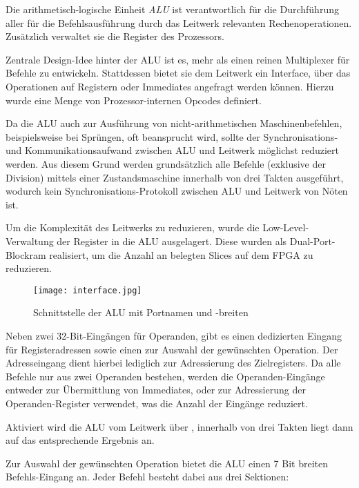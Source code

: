 \label{ch:alu}

Die arithmetisch-logische Einheit \textit{ALU} ist verantwortlich f\"ur die Durchf\"uhrung aller f\"ur die Befehlsausf\"uhrung durch das Leitwerk relevanten Rechenoperationen. Zus\"atzlich verwaltet sie die Register des Prozessors.


Zentrale Design-Idee hinter der ALU ist es, mehr als einen reinen Multiplexer f\"ur Befehle zu entwickeln. Stattdessen bietet sie dem Leitwerk ein Interface,
\"uber das Operationen auf Registern oder Immediates angefragt werden k\"onnen. Hierzu wurde eine Menge von Prozessor-internen Opcodes definiert.

Da die ALU auch zur Ausf\"uhrung von nicht-arithmetischen Maschinenbefehlen, beispielsweise bei Spr\"ungen, oft beansprucht wird, sollte der Synchronisations- und Kommunikationsaufwand zwischen ALU und Leitwerk m\"oglichst reduziert werden.
Aus diesem Grund werden grunds\"atzlich alle Befehle (exklusive der Division) mittels einer Zustandsmaschine innerhalb von drei Takten ausgef\"uhrt, wodurch kein Synchronisations-Protokoll zwischen ALU und Leitwerk von N\"oten ist.

Um die Komplexit\"at des Leitwerks zu reduzieren, wurde die Low-Level-Verwaltung der Register in die ALU ausgelagert. Diese wurden als Dual-Port-Blockram realisiert, um die Anzahl an belegten Slices auf dem FPGA zu reduzieren.

\begin{figure}[H]
	\centering
	\label{fig:aluinterface}
		\texttt{[image: interface.jpg]}
	\caption[Schnittstelle der ALU-Einheit]{Schnittstelle der ALU mit Portnamen und -breiten}
\end{figure}

Neben zwei 32-Bit-Eing\"angen f\"ur Operanden, gibt es einen dedizierten Eingang f\"ur Registeradressen sowie einen zur Auswahl der gew\"unschten Operation. 
Der Adresseingang dient hierbei lediglich zur Adressierung des Zielregisters. Da alle Befehle nur aus zwei Operanden bestehen, werden die Operanden-Eing\"ange entweder zur \"Ubermittlung von Immediates, oder zur Adressierung der Operanden-Register verwendet, was die Anzahl der Eing\"ange reduziert.

Aktiviert wird die ALU vom Leitwerk \"uber , innerhalb von drei Takten liegt dann auf  das entsprechende Ergebnis an.

Zur Auswahl der gew\"unschten Operation bietet die ALU einen 7 Bit breiten Befehls-Eingang an.
Jeder Befehl besteht dabei aus drei Sektionen\vspace{10pt}:

